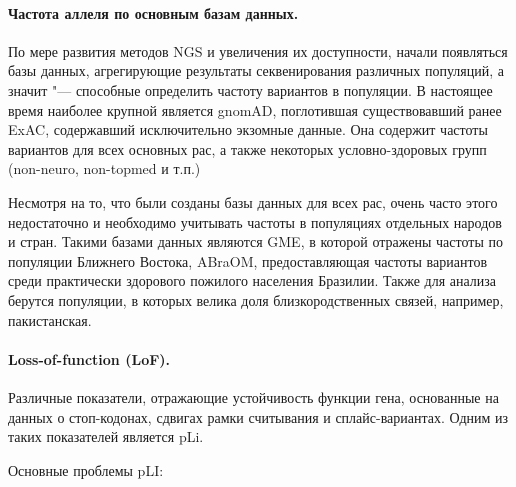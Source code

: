 \documentclass[a4paper,12pt]{article}
\begin{document}
\paragraph{Частота аллеля по основным базам данных.}
По мере развития методов NGS и увеличения их доступности, начали появляться базы данных, агрегирующие результаты секвенирования различных популяций, а значит "--- способные определить частоту вариантов в популяции.
В настоящее время наиболее крупной является gnomAD\cite{gnomad}, поглотившая существовавший ранее ExAC, содержавший исключительно экзомные данные.
Она содержит частоты вариантов для всех основных рас, а также некоторых условно-здоровых групп (non-neuro, non-topmed и т.п.)

Несмотря на то, что были созданы базы данных для всех рас, очень часто этого недостаточно и необходимо учитывать частоты в популяциях отдельных народов и стран.
Такими базами данных являются GME\cite{gme}, в которой отражены частоты по популяции Ближнего Востока, ABraOM\cite{abraom}, предоставляющая частоты вариантов среди практически здорового пожилого населения Бразилии.
Также для анализа берутся популяции, в которых велика доля близкородственных связей, например, пакистанская\cite{saleheen}.

\paragraph{Loss-of-function (LoF).}
Различные показатели, отражающие устойчивость функции гена, основанные на данных о стоп-кодонах, сдвигах рамки считывания и сплайс-вариантах.
Одним из таких показателей является pLi.

Основные проблемы pLI\cite{ziegler}:
\end{document}
